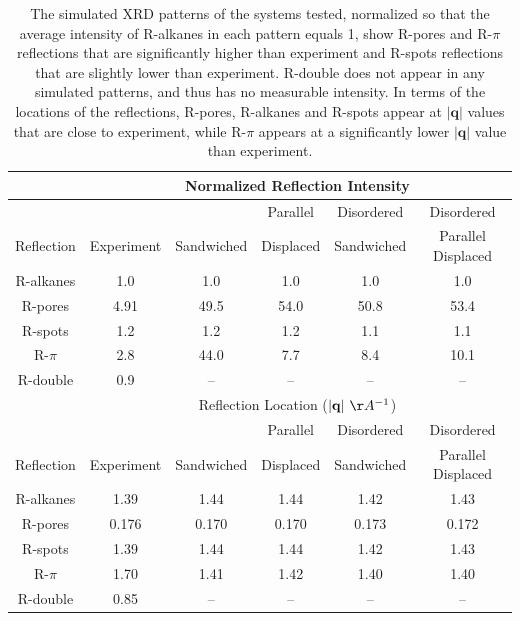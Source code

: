 \documentclass[journal=jpcbfk,manuscript=article]{achemso}
\begin{document}
\begin{table}[h]
  \centering
  \begin{tabular}{c|ccccc}
  \toprule
 		     & \multicolumn{5}{c}{Normalized Reflection Intensity}                   \\
  \hline
             &            &            & Parallel  & Disordered & Disordered         \\
  Reflection & Experiment & Sandwiched & Displaced & Sandwiched & Parallel Displaced \\
  \midrule
  R-alkanes  & 1.0        &  1.0       &  1.0      &  1.0       &  1.0               \\
  R-pores    & 4.91       & 49.5       & 54.0      & 50.8       & 53.4               \\
  R-spots    & 1.2        &  1.2       &  1.2      &  1.1       &  1.1               \\
  R-$\pi$    & 2.8        & 44.0       &  7.7      &  8.4       & 10.1               \\
  R-double   & 0.9        &  --        & --        &  --        & --                 \\ 
  \hline
   		     & \multicolumn{5}{c}{Reflection Location ($|\mathbf{q}|~\AA^{-1}$)}     \\
  \hline
             &            &            & Parallel  & Disordered & Disordered         \\
  Reflection & Experiment & Sandwiched & Displaced & Sandwiched & Parallel Displaced \\
  \midrule
  R-alkanes  & 1.39       &  1.44      &  1.44     & 1.42       & 1.43               \\  
  R-pores    & 0.176      &  0.170     &  0.170    & 0.173      & 0.172              \\
  R-spots    & 1.39       &  1.44      &  1.44     & 1.42       & 1.43               \\
  R-$\pi$    & 1.70       &  1.41      &  1.42     & 1.40       & 1.40               \\
  R-double   & 0.85       &  --        & --        &  --        & --                 \\ 
  \bottomrule
  \end{tabular}
    \caption{The simulated XRD patterns of the systems tested, normalized so that
	  the average intensity of R-alkanes in each pattern equals 1, show R-pores and
	  R-$\pi$ reflections that are significantly higher than experiment and R-spots
	  reflections that are slightly lower than experiment. R-double does not appear
	  in any simulated patterns, and thus has no measurable intensity. In terms of 
	  the locations of the reflections, R-pores, R-alkanes and R-spots appear at $|\mathbf{q}|$
	  values that are close to experiment, while R-$\pi$ appears at a significantly lower
	  $|\mathbf{q}|$ value than experiment.\label{table:relative_intensities_300K}}
  \end{table}  
  
\end{document}
